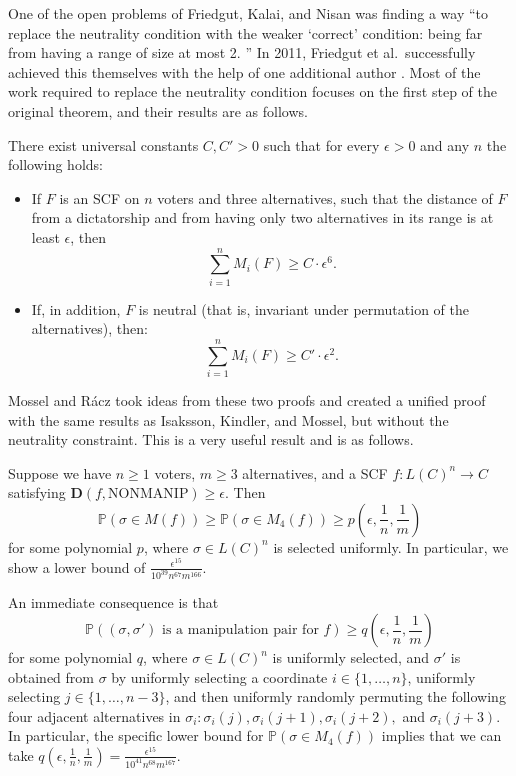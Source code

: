 	One of the open problems of Friedgut, Kalai, and Nisan was finding a way ``to replace the neutrality condition with the weaker `correct' condition: being far from having a range of size at most 2. \cite{friedgut2008elections}'' In 2011, Friedgut et al.\ successfully achieved this themselves with the help of one additional author \cite{friedgut2011quantitative}. Most of the work required to replace the neutrality condition focuses on the first step of the original theorem, and their results are as follows.
	\begin{theorem}
		There exist universal constants $C, C' > 0$ such that for every $\epsilon > 0$ and any $n$ the following holds:
		\begin{itemize}
			\item If $F$ is an SCF on $n$ voters and three alternatives, such that the distance of $F$ from a dictatorship and from having only two alternatives in its range is at least $\epsilon$, then
			\[
				\sum_{i=1}^n M_i(F) \ge C \cdot \epsilon^6.
			\]
			\item If, in addition, $F$ is neutral (that is, invariant under permutation of the alternatives), then:
			\[
				\sum_{i=1}^n M_i(F) \ge C' \cdot \epsilon^2.
			\]
		\end{itemize}
	\end{theorem}

	Mossel and R\'{a}cz \cite{mossel2011quantitative} took ideas from these two proofs and created a unified proof with the same results as Isaksson, Kindler, and Mossel, but without the neutrality constraint. This is a very useful result and is as follows.
	\begin{theorem}
		Suppose we have $n \ge 1$ voters, $m \ge 3$ alternatives, and a SCF $f : L(C)^n \rightarrow C$ satisfying $\mathbf{D}(f, \mathrm{NONMANIP}) \ge \epsilon$. Then
		\[
			\mathbb{P}(\sigma \in M(f)) \ge \mathbb{P}(\sigma \in M_4(f)) \ge p \left( \epsilon, \frac{1}{n}, \frac{1}{m} \right)
		\]
		for some polynomial $p$, where $\sigma \in L(C)^n$ is selected uniformly. In particular, we show a lower bound of $\frac{\epsilon^{15}}{10^{39} n^{67} m^{166}}$.

		An immediate consequence is that
		\[
			\mathbb{P}((\sigma, \sigma') \text{ is a manipulation pair for } f) \ge q \left( \epsilon, \frac{1}{n}, \frac{1}{m} \right)
		\]
		for some polynomial $q$, where $\sigma \in L(C)^n$ is uniformly selected, and $\sigma'$ is obtained from $\sigma$ by uniformly selecting a coordinate $i \in \{ 1, \ldots, n \}$, uniformly selecting $j \in \{ 1, \ldots, n-3 \}$, and then uniformly randomly permuting the following four adjacent alternatives in $\sigma_i: \sigma_i(j), \sigma_i(j+1), \sigma_i(j+2),$ and $\sigma_i(j+3)$. In particular, the specific lower bound for $\mathbb{P}(\sigma \in M_4(f))$ implies that we can take $q \left( \epsilon, \frac{1}{n}, \frac{1}{m} \right) = \frac{\epsilon^{15}}{10^{41} n^{68} m^{167}}$.
	\end{theorem}

